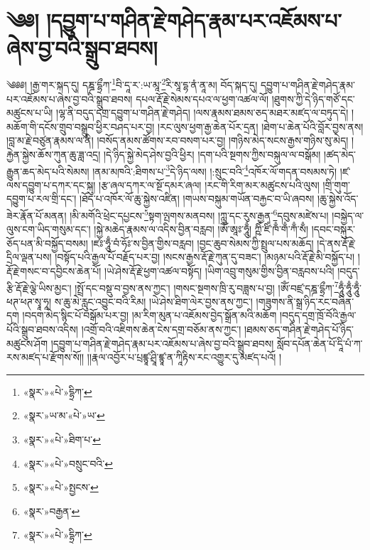 \chapter{༄༅། །དབྱུག་པ་གཤིན་རྗེ་གཤེད་རྣམ་པར་འཇོམས་པ་ཞེས་བྱ་བའི་སྒྲུབ་ཐབས།}༄༅༅། །རྒྱ་གར་སྐད་དུ། དཎྜ་དྷྲྀཀ་\footnote{«སྣར་»«པེ་»དྷྲིཀ་}བི་དཱ་ར་:ཡ་མཱ་\footnote{«སྣར་»ཡ་མ་«པེ་»ཡ་}རི་སཱ་དྷ་ནཾ་ནཱ་མ། བོད་སྐད་དུ། དབྱུག་པ་གཤིན་རྗེ་གཤེད་རྣམ་པར་འཇོམས་པ་ཞེས་བྱ་བའི་སྒྲུབ་ཐབས། དཔལ་རྡོ་རྗེ་སེམས་དཔའ་ལ་ཕྱག་འཚལ་ལོ། །ཐུགས་ཀྱི་དེ་ཉིད་གཙོ་དང་མཚུངས་པ་ཡི། །ལྷ་ནི་བདུད་དགྲ་དབྱུག་པ་གཤིན་རྗེ་གཤེད། །ལས་རྣམས་ཐམས་ཅད་མཐར་མཛད་ལ་བཏུད་དེ། །མཆོག་གི་དངོས་གྲུབ་བསྒྲུབ་ཕྱིར་བཤད་པར་བྱ། །རང་ལུས་ཕྱག་རྒྱ་ཆེན་པོར་དྲན། །ཐེག་པ་ཆེན་པོའི་བློར་བྱས་ནས། །བླ་མ་རྗེ་བཙུན་རྣམས་ལ་ནི། །བསོད་ནམས་ཚོགས་རབ་བསག་པར་བྱ། །གཉིས་མེད་སངས་རྒྱས་གཉིས་སུ་མེད། །རྐྱེན་སྐྱེས་ཆོས་ཀུན་ཆུ་ཟླ་འདྲ། །དེ་ཉིད་སྐྱེ་མེད་ཤེས་བྱའི་ཕྱིར། །དག་པའི་སྔགས་ཀྱིས་བསྐུལ་ལ་བསྒོམ། །ཚད་མེད་རྒྱུན་ཆད་མེད་པའི་སེམས། །ནམ་མཁའི་:ཐིགས་པ་\footnote{«སྣར་»«པེ་»ཐིག་པ་}དེ་ཉིད་ལས། །:སྲུང་བའི་\footnote{«སྣར་»«པེ་»བསྲུང་བའི་}འཁོར་ལོ་གདན་བསམས་ཏེ། །ཛ་ལས་དབྱུག་པ་དཀར་དང་སྐུ། །རྩ་ཞལ་དཀར་ལ་སྔོ་དམར་ཞལ། །རང་གི་རིག་མར་མཚུངས་པའི་ལུས། །གྲི་གུག་དབྱུག་པ་རལ་གྲི་དང་། །ཐོད་པ་འཁོར་ལོ་ཆུ་སྐྱེས་འཛིན། །གཡས་བསྐུམ་གཡོན་བརྐྱང་བ་ཡི་ཞབས། །ཆུ་སྐྱེས་འོད་ཟེར་རྣོན་པོ་མནན། །མི་མགོའི་ཕྲེང་དཔྱངས་\footnote{«སྣར་»«པེ་»སྤྱངས་}སྟག་ལྤགས་མནབས། །ཀླུ་དང་རུས་རྒྱན་\footnote{«སྣར་»བརྒྱན་}དབུས་མཛེས་པ། །བསྐྱེད་ལ་ལུས་ངག་ཡིད་གསུམ་དང་། །སྐྱེ་མཆེད་རྣམས་ལ་འདིས་བྱིན་བརླབ། །ཨོཾ་ཨཱཿ་ཧཱུྃ། ཀྵིཾ་ཛིཾ་ཁྃ་གྃ་ཀྃ་སྃ། །དབང་བསྐུར་ཅོད་པན་མི་བསྐྱོད་བསམ། །ཛཿ་ཧཱུྃ་བཾ་ཧོཿ་ས་བྱིན་གྱིས་བརླབ། །བྱང་ཆུབ་སེམས་ཀྱི་སྤྲུལ་པས་མཆོད། །དེ་ནས་རྡོ་རྗེ་དྲིལ་ལྡན་པས། །བསྟོད་པའི་རྒྱལ་པོ་བརྗོད་པར་བྱ། །སངས་རྒྱས་རྡོ་རྗེ་ཀུན་དུ་བཟང་། །མཉམ་པའི་རྡོ་རྗེ་མི་བསྐྱོད་པ། །རྡོ་རྗེ་གསང་བ་དབྱིངས་ཆེན་པོ། །ཡེ་ཤེས་རྡོ་རྗེ་ཕྱག་འཚལ་བསྟོད། །ཡིག་འབྲུ་གསུམ་གྱིས་བྱིན་བརླབས་པའི། །བདུད་རྩི་རྡོ་རྗེ་ལྕེ་ཡིས་མྱང་། །སྤྲོ་དང་བསྡུ་བ་བྱས་ནས་ཀྱང་། །གསང་སྔགས་ཁྲི་རུ་བཟླས་པ་བྱ། །ཨོཾ་བཛྲ་དཎྜ་དྷྲྀཀ་\footnote{«སྣར་»«པེ་»དྷྲིཀ་}ཧཱུྃ་ཧཱུྃ་ཧཱུྃ་ཕཊ་ཕཊ་སྭཱ་ཧཱ། ས་ཆུ་མེ་རླུང་འབྱུང་བའི་རིམ། །ཡེ་ཤེས་ཐིག་ལེར་བྱས་ནས་ཀྱང་། །གཟུགས་ནི་སྒྲ་ཉིད་རང་བཞིན་དག །བདག་མེད་སྙིང་པོ་བསྒོམ་པར་བྱ། །མ་རིག་མུན་པ་འཇོམས་བྱེད་སྒྲོན་མའི་མཆོག །བདུད་དགྲ་ཁྲོ་བོའི་རྒྱལ་པོའི་སྒྲུབ་ཐབས་འདིས། །འགྲོ་བའི་འཇིགས་ཆེན་ངེས་དགྲ་བཅོམ་ནས་ཀྱང་། །ཐམས་ཅད་གཤིན་རྗེ་གཤེད་པོ་ཉིད་མཚུངས་ཤོག །དབྱུག་པ་གཤིན་རྗེ་གཤེད་རྣམ་པར་འཇོམས་པ་ཞེས་བྱ་བའི་སྒྲུབ་ཐབས། སློབ་དཔོན་ཆེན་པོ་དཱི་པཾ་ཀ་རས་མཛད་པ་རྫོགས་སོ།། །།རྣལ་འབྱོར་པ་པྲཛྙཱ་ཤྲཱི་ཛྙཱ་ན་ཀཱིརྟིས་རང་འགྱུར་དུ་མཛད་པའོ། །
 